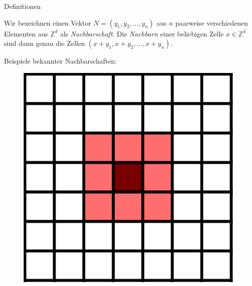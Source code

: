 \documentclass[aspectratio=169]{beamer}
\begin{document}
  \begin{frame}{Definitionen}
    \begin{definition*}[Nachbarschaft]
      Wir bezeichnen einen Vektor $N = (y_1, y_2, \dots, y_n)$ aus $n$ paarweise verschiedenen Elementen aus $\mathbb{Z}^d$ als \textit{Nachbarschaft}. Die \textit{Nachbarn} einer beliebigen Zelle $x \in \mathbb{Z}^d$ sind dann genau die Zellen $(x + y_1, x + y_2, \dots, x + y_n)$.
    \end{definition*}

    \pause

    Beispiele bekannter Nachbarschaften:

    \begin{multicols*}{2}
      \begin{multicols*}{2}
        \begin{figure}[H]
          \centering
          \includegraphics[width = 0.28 \textheight]{moore_1.png}
        \end{figure}


\end{multicols*}
\end{multicols*}
\end{frame}
\end{document}
